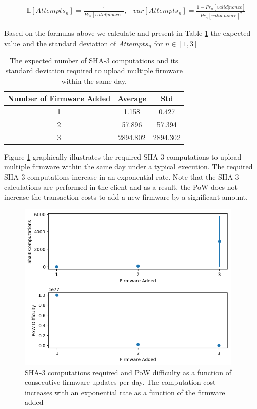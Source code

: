 {{{\begin{align*}
&\mathbb{E}[Attempts_n] = \frac{1}{Pr_n[valid|nonce]},
&var[Attempts_n] = \frac{1-Pr_n[valid|nonce]}{Pr_n[valid|nonce]^2}
\end{align*}

Based on the formulas above we calculate and present in Table \ref{tab:pow_prob} the expected value and the standard deviation of $Attempts_n$ for $n \in [1,3]$

\begin {table}[htb!]
\caption {The expected number of SHA-3 computations and its standard deviation required to upload multiple firmware within the same day.} \label{tab:pow_prob} 
\begin{center}
 \begin{tabular}{|c| c|c|}
 \hline
 Number of Firmware Added & Average & Std \\ [0.5ex] 
 \hline
  1 & 1.158 & 0.427  \\
  \hline
  2 & 57.896 & 57.394 \\
  \hline
  3 & 2894.802 & 2894.302 \\
  \hline
\end{tabular}
\end{center}
\end {table}

Figure \ref{fig:powCost} graphically illustrates the required SHA-3 computations to upload multiple firmware within the same day under a typical execution. The required SHA-3 computations increase in an exponential rate. Note that the SHA-3 calculations are performed in the client and as a result, the PoW does not increase the transaction costs to add a new firmware by a significant amount.

\begin{figure}[htb!]
\centering
\includegraphics[width=0.95\textwidth]{./pics/pow_cost.png}
\caption{SHA-3 computations required and PoW difficulty as a function of consecutive firmware updates per day. The computation cost increases with an exponential rate as a function of the firmware added}
\label{fig:powCost}
\end{figure}

}}}
